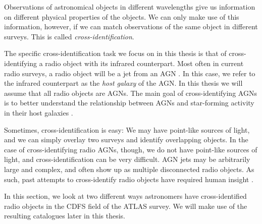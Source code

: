 
        Observations of astronomical objects in different wavelengths give us
        information on different physical properties of the objects. We can only
        make use of this information, however, if we can match observations of
        the same object in different surveys. This is called
        \emph{cross-identification}.

        The specific cross-identification task we focus on in this thesis is
        that of cross-identifying a radio object with its infrared counterpart.
        Most often in current radio surveys, a radio object will be a jet from
        an AGN \citep{norris11}. In this case, we refer to the infrared
        counterpart as the \emph{host galaxy} of the AGN. In this thesis we will
        assume that all radio objects are AGNs.
        The main goal of cross-identifying AGNs is to better understand the
        relationship between AGNs and star-forming activity in their host
        galaxies \citep{norris06}.

        Sometimes, cross-identification is easy: We may have point-like sources
        of light, and we can simply overlay two surveys and identify overlapping
        objects. In the case of cross-identifying radio AGNs, though, we do not
        have point-like sources of light, and cross-identification can be very
        difficult. AGN jets may be arbitrarily large and complex, and often show
        up as multiple disconnected radio objects. As such, past attempts to
        cross-identify radio objects have required human insight
        \citep{norris06,fan15}.

        In this section, we look at two different ways astronomers have
        cross-identified radio objects in the CDFS field of the ATLAS survey. We
        will make use of the resulting catalogues later in this thesis.


